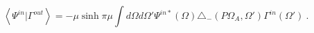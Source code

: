 \begin{equation}\label{QGprod}
\left<\Psi^{in}|
\Gamma^{out}\right>=-\mu\sinh\pi\mu
\int d\Omega d\Omega'
\Psi^{in *}(\Omega)\triangle_-(P\Omega_A,
\Omega')\Gamma^{in}(\Omega') \ .
\end{equation}

